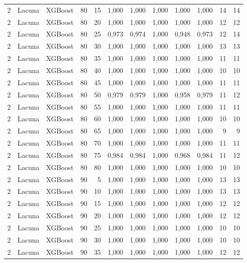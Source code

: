 \begin{longtable}{@{}rllrrrrrrrrr@{}}
2 & Lacuna & XGBoost & 80 & 15 & 1,000 & 1,000 & 1,000 & 1,000 & 1,000 & 14 & 14 \\
2 & Lacuna & XGBoost & 80 & 20 & 1,000 & 1,000 & 1,000 & 1,000 & 1,000 & 12 & 12 \\
2 & Lacuna & XGBoost & 80 & 25 & 0,973 & 0,974 & 1,000 & 0,948 & 0,973 & 12 & 14 \\
2 & Lacuna & XGBoost & 80 & 30 & 1,000 & 1,000 & 1,000 & 1,000 & 1,000 & 13 & 13 \\
2 & Lacuna & XGBoost & 80 & 35 & 1,000 & 1,000 & 1,000 & 1,000 & 1,000 & 11 & 11 \\
2 & Lacuna & XGBoost & 80 & 40 & 1,000 & 1,000 & 1,000 & 1,000 & 1,000 & 10 & 10 \\
2 & Lacuna & XGBoost & 80 & 45 & 1,000 & 1,000 & 1,000 & 1,000 & 1,000 & 11 & 11 \\
2 & Lacuna & XGBoost & 80 & 50 & 0,979 & 0,979 & 1,000 & 0,958 & 0,979 & 11 & 12 \\
2 & Lacuna & XGBoost & 80 & 55 & 1,000 & 1,000 & 1,000 & 1,000 & 1,000 & 11 & 11 \\
2 & Lacuna & XGBoost & 80 & 60 & 1,000 & 1,000 & 1,000 & 1,000 & 1,000 & 10 & 10 \\
2 & Lacuna & XGBoost & 80 & 65 & 1,000 & 1,000 & 1,000 & 1,000 & 1,000 & 9 & 9 \\
2 & Lacuna & XGBoost & 80 & 70 & 1,000 & 1,000 & 1,000 & 1,000 & 1,000 & 11 & 11 \\
2 & Lacuna & XGBoost & 80 & 75 & 0,984 & 0,984 & 1,000 & 0,968 & 0,984 & 11 & 12 \\
2 & Lacuna & XGBoost & 80 & 80 & 1,000 & 1,000 & 1,000 & 1,000 & 1,000 & 10 & 10 \\
2 & Lacuna & XGBoost & 90 & 5 & 1,000 & 1,000 & 1,000 & 1,000 & 1,000 & 13 & 13 \\
2 & Lacuna & XGBoost & 90 & 10 & 1,000 & 1,000 & 1,000 & 1,000 & 1,000 & 13 & 13 \\
2 & Lacuna & XGBoost & 90 & 15 & 1,000 & 1,000 & 1,000 & 1,000 & 1,000 & 12 & 12 \\
2 & Lacuna & XGBoost & 90 & 20 & 1,000 & 1,000 & 1,000 & 1,000 & 1,000 & 12 & 12 \\
2 & Lacuna & XGBoost & 90 & 25 & 1,000 & 1,000 & 1,000 & 1,000 & 1,000 & 10 & 10 \\
2 & Lacuna & XGBoost & 90 & 30 & 1,000 & 1,000 & 1,000 & 1,000 & 1,000 & 10 & 10 \\
2 & Lacuna & XGBoost & 90 & 35 & 1,000 & 1,000 & 1,000 & 1,000 & 1,000 & 12 & 12 \\

\end{longtable}
